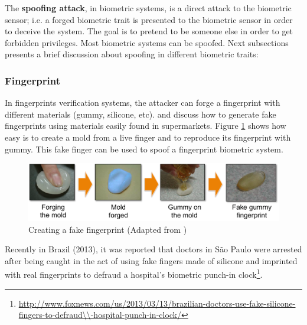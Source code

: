 
The \textbf{spoofing attack}, in biometric systems, is a direct attack to the biometric sensor; i.e. a forged biometric trait is presented to the biometric sensor in order to deceive the system. 
The goal is to pretend to be someone else in order to get forbidden privileges. 
Most biometric systems can be spoofed. 
Next subsections presents a brief discussion about spoofing in different biometric traits:

\subsubsection{Fingerprint}

In fingerprints verification systems, the attacker can forge a fingerprint with different materials (gummy, silicone, etc). 
\cite{matsumoto2002impact} and \cite{leyden2002gummi} discuss how to generate fake fingerprints using materials easily found in supermarkets. 
Figure \ref{fig:finger_attack} shows how easy is to create a mold from a live finger and to reproduce its fingerprint with gummy. 
This fake finger can be used  to spoof a fingerprint biometric system.

\begin{figure}[!htb]
\begin{center}
\includegraphics [width=16cm] {images/finger_print_attack.pdf}
\caption[Creating a fake fingerprint]{Creating a fake fingerprint (Adapted from \citep{matsumoto2002impact})} \label{fig:finger_attack}
\end{center}
\end{figure}

Recently in Brazil (2013), it was reported that doctors in S\~ao Paulo were arrested after being caught in the act of using fake fingers made of silicone and imprinted with real fingerprints to defraud a hospital's biometric punch-in clock\footnote{\url{http://www.foxnews.com/us/2013/03/13/brazilian-doctors-use-fake-silicone-fingers-to-defraud\\-hospital-punch-in-clock/}}.

